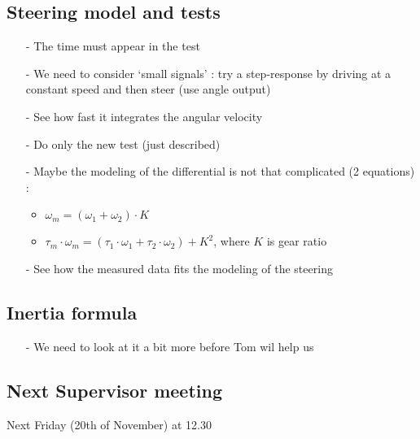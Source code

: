 \subsection{Steering model and tests}
\begin{itemize}
\item[-] The time must appear in the test
\item[-] We need to consider `small signals' : try a step-response by driving at a constant speed and then steer (use angle output)
\item[-] See how fast it integrates the angular velocity
\item[-] Do only the new test (just described)
\item[-] Maybe the modeling of the differential is not that complicated (2 equations) :
\begin{itemize}
  \item $\omega_m = (\omega_1 + \omega_2) \cdot K$
  \item $\tau_m \cdot \omega_m = (\tau_1 \cdot \omega_1 + \tau_2 \cdot \omega_2) + K^2$, where $K$ is gear ratio
\end{itemize}
\item[-] See how the measured data fits the modeling of the steering

\end{itemize}

\subsection{Inertia formula}
\begin{itemize}
\item[-] We need to look at it a bit more before Tom wil help us
\end{itemize}

\subsection{Next Supervisor meeting}
Next Friday (20th of November) at 12.30



